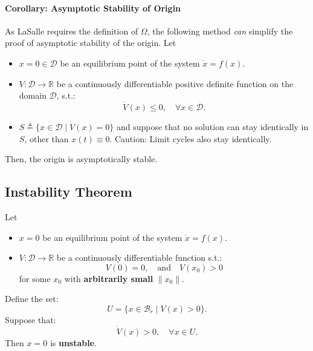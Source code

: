 \paragraph{Corollary: Asymptotic Stability of Origin}
As LaSalle requires the definition of $\Omega$, the following method \textit{can} simplify the proof of asymptotic stability of the origin. %
\newpar{}
Let
\begin{itemize}
    \item $x = 0 \in \mathcal{D}$ be an equilibrium point of the system $\dot{x} = f(x)$.
    \item $V: \mathcal{D} \to \mathbb{R}$ be a continuously differentiable positive definite function on the domain $\mathcal{D}$, s.t.:
          \noindent\begin{equation*}
              \dot{V} (x) \leq 0, \quad \forall x \in \mathcal{D}.
          \end{equation*}
    \item $S \triangleq \{x \in \mathcal{D} \mid \dot{V} (x) = 0\}$ and suppose that no solution can stay identically in $S$, other than $x(t) \equiv 0$. Caution: Limit cycles also stay identically.  %
\end{itemize}

Then, the origin is asymptotically stable.

\subsection{Instability Theorem}

Let
\begin{itemize}
    \item $x = 0$ be an equilibrium point of the system $\dot{x} = f(x)$.
    \item $V: \mathcal{D} \to \mathbb{R}$ be a continuously differentiable function s.t.:
          \noindent\begin{equation*}
              V (0) = 0, \quad \text{and} \quad V (x_0) > 0
          \end{equation*}
          for some $x_0$ with \textbf{arbitrarily small} $\|x_0\|$.
\end{itemize}

Define the set:
\noindent\begin{equation*}
    U = \{x \in \mathcal{B}_r \mid V (x) > 0\}.
\end{equation*}
Suppose that:
\noindent\begin{equation*}
    \dot{V} (x) > 0, \quad \forall x \in U.
\end{equation*}
Then $x = 0$ is \textbf{unstable}.

